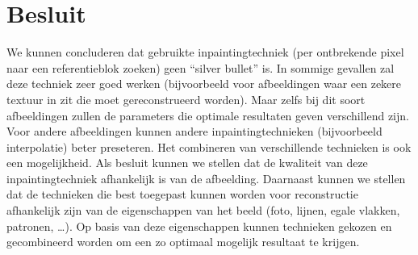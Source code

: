 \documentclass[titlepage]{article}
\begin{document}
\section{Besluit}
We kunnen concluderen dat gebruikte inpaintingtechniek (per ontbrekende pixel naar een referentieblok zoeken) geen ``silver bullet'' is. In sommige gevallen zal deze techniek zeer goed werken (bijvoorbeeld voor afbeeldingen waar een zekere textuur in zit die moet gereconstrueerd worden). Maar zelfs bij dit soort afbeeldingen zullen de parameters die optimale resultaten geven verschillend zijn. Voor andere afbeeldingen kunnen andere inpaintingtechnieken (bijvoorbeeld interpolatie) beter preseteren. Het combineren van verschillende technieken is ook een mogelijkheid. Als besluit kunnen we stellen dat de kwaliteit van deze inpaintingtechniek afhankelijk is van de afbeelding. Daarnaast kunnen we stellen dat de technieken die best toegepast kunnen worden voor reconstructie afhankelijk zijn van de eigenschappen van het beeld (foto, lijnen, egale vlakken, patronen, \ldots). Op basis van deze eigenschappen kunnen technieken gekozen en gecombineerd worden om een zo optimaal mogelijk resultaat te krijgen.
\end{document}
